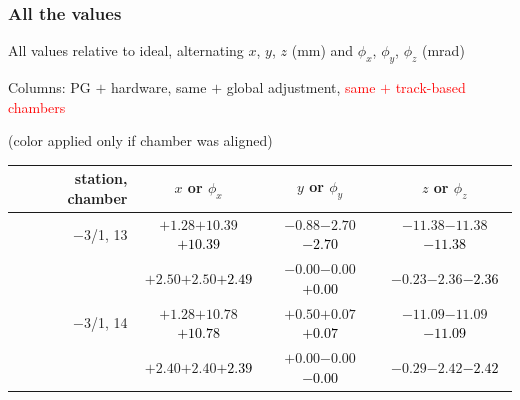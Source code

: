 \documentclass[compress]{beamer}
\begin{document}
\begin{frame}
\frametitle{All the values}
\tiny

All values relative to ideal, alternating $x$, $y$, $z$ (mm) and $\phi_x$, $\phi_y$, $\phi_z$ (mrad)

Columns: PG $+$ hardware, same $+$ global adjustment, \textcolor{red}{same $+$ track-based chambers}

\hfill (color applied only if chamber was aligned)

\vfill
\renewcommand{\arraystretch}{1.1}
\begin{tabular}{r | c | c | c}
station, chamber & $x$ or $\phi_x$ & $y$ or $\phi_y$ & $z$ or $\phi_z$ \\\hline
$-$3/1, 13 & $+1.28$\hspace{0.1 cm}$+10.39$\hspace{0.1 cm}\textcolor{black}{$+10.39$} & $-0.88$\hspace{0.1 cm}$-2.70$\hspace{0.1 cm}\textcolor{black}{$-2.70$} & $-11.38$\hspace{0.1 cm}$-11.38$\hspace{0.1 cm}\textcolor{black}{$-11.38$} \\
           & $+2.50$\hspace{0.1 cm}$+2.50$\hspace{0.1 cm}\textcolor{black}{$+2.49$} & $-0.00$\hspace{0.1 cm}$-0.00$\hspace{0.1 cm}\textcolor{black}{$+0.00$} & $-0.23$\hspace{0.1 cm}$-2.36$\hspace{0.1 cm}\textcolor{black}{$-2.36$} \\
$-$3/1, 14 & $+1.28$\hspace{0.1 cm}$+10.78$\hspace{0.1 cm}\textcolor{black}{$+10.78$} & $+0.50$\hspace{0.1 cm}$+0.07$\hspace{0.1 cm}\textcolor{black}{$+0.07$} & $-11.09$\hspace{0.1 cm}$-11.09$\hspace{0.1 cm}\textcolor{black}{$-11.09$} \\
           & $+2.40$\hspace{0.1 cm}$+2.40$\hspace{0.1 cm}\textcolor{black}{$+2.39$} & $+0.00$\hspace{0.1 cm}$-0.00$\hspace{0.1 cm}\textcolor{black}{$-0.00$} & $-0.29$\hspace{0.1 cm}$-2.42$\hspace{0.1 cm}\textcolor{black}{$-2.42$} \\

\end{tabular}
\end{frame}
\end{document}
